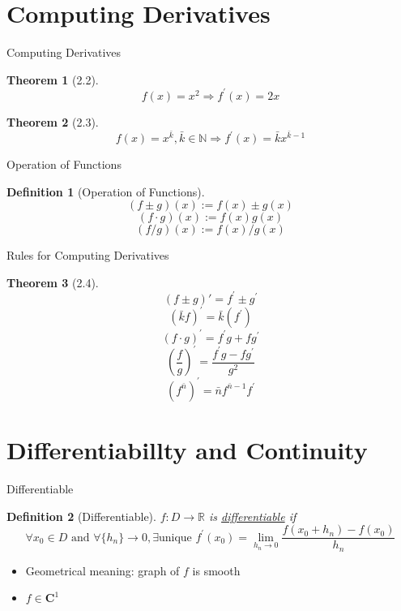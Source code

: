 \documentclass[final]{beamer}
\newtheorem{defn}{Definition}
\newtheorem{thm}{Theorem}
\begin{document}
\section{Computing Derivatives} %
\label{sec:computing_derivatives}

\begin{frame}[t]{Computing Derivatives}
	\begin{thm}
		[2.2]
		\[
			f(x)=x^2 \Rightarrow f^\prime (x) = 2x
		\]
	\end{thm}

	\begin{thm}
		[2.3]
		\[
			f(x)=x^{\bar k} , \bar k \in \mathbb{N} \Rightarrow f^\prime (x) = \bar k x^{\bar k - 1}
		\]
	\end{thm}
\end{frame}

\begin{frame}[t]{Operation of Functions}
	\begin{defn}
		[Operation of Functions]
		\[
			(f\pm g)(x) := f(x)\pm g(x)
		\]
		\[
			(f\cdot g)(x) := f(x)g(x)
		\]\[
			(f/g)(x) := f(x)/g(x)
		\]
	\end{defn}
\end{frame}

\begin{frame}[t]{Rules for Computing Derivatives}
	\begin{thm}
		[2.4]
		\[
			(f\pm g)\prime = f^\prime \pm g^\prime
		\]\[
			(\bar k f)^\prime = \bar k (f^\prime)
		\]\[
			(f\cdot g)^\prime = f^\prime g + f g^\prime 
		\]\[
			\left(\frac{f}{g}\right)^\prime = \frac{f^\prime g - fg^\prime}{g^2}
		\]\[
			(f^{\bar n})^\prime = \bar n f^{\bar n - 1} f^\prime 
		\]
	\end{thm}
\end{frame}


\section{Differentiabillty and Continuity} %
\label{sec:differentiablilty_and_continuity}
\begin{frame}[t]{Differentiable}
	\begin{defn}
		[Differentiable]
		$f:D\rightarrow \mathbb{R}$ is \uline{differentiable} if \[
			\forall x_0\in D\text{ and }\forall\{h_n\}\rightarrow 0, \exists \text{unique } f^\prime(x_0) = \lim_{h_n\rightarrow 0}\frac{f(x_0+h_n)-f(x_0)}{h_n}
		\]
	\end{defn}
	\begin{itemize}
		\item Geometrical meaning: graph of $f$ is smooth
		\item $f\in \mathbf{C}^1$
	\end{itemize}
\end{frame}
\end{document}
